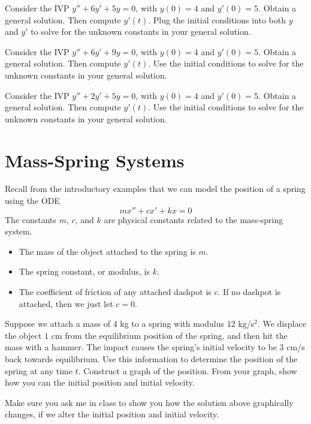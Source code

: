 \begin{problem}
 Consider the IVP $y''+6y'+5y=0$, with $y(0)=4$ and $y'(0)=5$.  Obtain a general solution. Then compute $y'(t)$. Plug the initial conditions into both $y$ and $y'$ to solve for the unknown constants in your general solution. 
\end{problem}

\begin{problem}
 Consider the IVP $y''+6y'+9y=0$, with $y(0)=4$ and $y'(0)=5$.  Obtain a general solution. Then compute $y'(t)$. Use the initial conditions to solve for the unknown constants in your general solution. 
\end{problem}

\begin{problem}
 Consider the IVP $y''+2y'+5y=0$, with $y(0)=4$ and $y'(0)=5$.  Obtain a general solution. Then compute $y'(t)$. Use the initial conditions to solve for the unknown constants in your general solution. 
\end{problem}


\section{Mass-Spring Systems}
 Recall from the introductory examples that we can model the position of a spring using the ODE $$mx''+cx'+kx=0$$
 The constants $m$, $c$, and $k$ are physical constants related to the mass-spring system.
\begin{itemize}
 \item The mass of the object attached to the spring is $m$.
 \item The spring constant, or modulus, is $k$.
 \item The coefficient of friction of any attached dashpot is $c$. If no dashpot is attached, then we just let $c=0$.
\end{itemize}

\begin{problem}
 Suppose we attach a mass of $4$ kg to a spring with modulus $12$ kg/s$^2$. We displace the object $1$ cm from the equilibrium position of the spring, and then hit the mass with a hammer. The impact causes the spring's initial velocity to be 3 cm/s back towards equilibrium.  Use this information to determine the position of the spring at any time $t$. Construct a graph of the position. From your graph, show how you can the initial position and initial velocity.
\end{problem}

Make sure you ask me in class to show you how the solution above graphically changes, if we alter the initial position and initial velocity.

